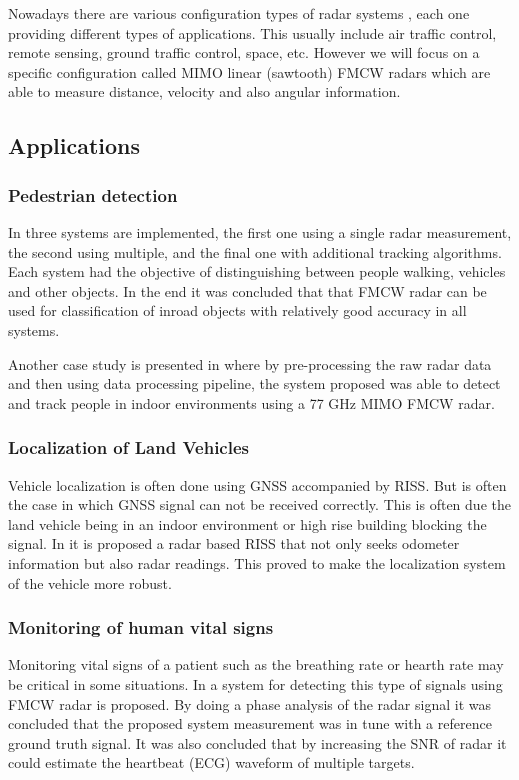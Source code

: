 Nowadays there are various configuration types of radar systems  \cite{typesradar}, each one providing different types of applications. This usually include air traffic control, remote sensing, ground traffic control, space, etc.  However we will focus on a specific configuration called \ac{MIMO} linear (sawtooth)  \ac{FMCW} radars which are  able to measure distance, velocity and also angular information. 

\subsection{Applications}


  \subsubsection{Pedestrian detection}  
 In \cite{heuel2010pedestrian} three systems are implemented, the first one using a single radar measurement, the second using multiple, and the final one with additional tracking algorithms. Each system had the objective of distinguishing between people walking, vehicles and other objects. In the end it was concluded that that \ac{FMCW} \ac{radar} can be used for classification of inroad objects with relatively good accuracy in all systems.
  
   Another case study is presented in \cite{knudde2017indoor} where by pre-processing the raw radar data and then using  data processing pipeline, the system proposed was able to detect and track people in indoor environments using a 77 GHz \ac{MIMO} \ac{FMCW} radar.
   
 \subsubsection{Localization of Land Vehicles}  
  Vehicle localization is often done using \ac{GNSS} accompanied by \ac{RISS}. But is often the case in which \ac{GNSS} signal can not be received correctly. This is often due the land vehicle being in an indoor environment or high rise building blocking the signal. In \cite{abosekeen2018utilizing} it is proposed a radar based \ac{RISS} that not only seeks odometer information but also radar readings. This proved to make the localization system of the vehicle more robust.
  
\subsubsection{Monitoring of human vital signs}  
Monitoring vital signs of a patient such as the breathing rate or hearth rate may be critical in some situations.
In \cite{alizadeh2019remote} a system for detecting this type of signals using  \ac{FMCW} \ac{radar} is proposed. By doing a phase analysis of the \ac{radar} signal it was concluded that the proposed system measurement was in tune with a reference ground truth signal. It was also concluded that by increasing the \ac{SNR} of \ac{radar} it could estimate the heartbeat (\ac{ECG}) waveform of multiple targets.

